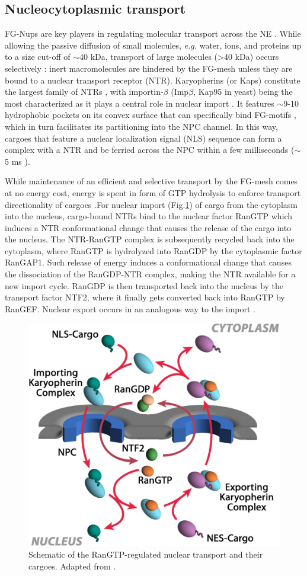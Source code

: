\subsection{Nucleocytoplasmic transport}	
FG-Nups are key players in regulating molecular transport across the NE \cite{Wente2000}. While allowing the passive diffusion of small molecules, \emph{e.g.} water, ions, and proteins up to a size cut-off of $\sim$40 kDa, transport of large molecules (>40 kDa) occurs selectively \cite{Zilman2007}: inert macromolecules are hindered by the FG-mesh unless they are bound to a nuclear transport receptor (NTR). Karyopherins (or Kaps) constitute the largest family of NTRs \cite{Tu2011}, with importin-$\beta$ (Imp$\beta$, Kap95 in yeast) being the most characterized as it plays a central role in nuclear import \cite{Harel2004}. It features $\sim$9-10 hydrophobic pockets on its convex surface that can specifically bind FG-motifs \cite{Bayliss2000}, which in turn facilitates its partitioning into the NPC channel. In this way, cargoes that feature a nuclear localization signal (NLS) sequence can form a complex with a NTR and be ferried across the NPC within a few milliseconds ($\sim$5 ms \cite{Dange2008}). 

While maintenance of an efficient and selective transport by the FG-mesh comes at no energy cost, energy is spent in form of GTP hydrolysis to enforce transport directionality of cargoes \cite{Gorlich1996a,Jovanovic-Talisman2017}.For nuclear import (Fig.\ref{fig:fig1.4}) of cargo from the cytoplasm into the nucleus, cargo-bound NTRs bind to the nuclear factor RanGTP which induces a NTR conformational change that causes the release of the cargo into the nucleus. The NTR-RanGTP complex is subsequently recycled back into the cytoplasm, where RanGTP is hydrolyzed into RanGDP by the cytoplasmic factor RanGAP1. Such release of energy induces a conformational change that causes the dissociation of the RanGDP-NTR complex, making the NTR available for a new import cycle. RanGDP is then transported back into the nucleus by the transport factor NTF2, where it finally gets converted back into RanGTP by RanGEF. Nuclear export occurs in an analogous way to the import \cite{Cautain2015}.
\begin{figure}[!htbp]
	\centering
	\includegraphics[width=0.65\linewidth]{figures/Figure1.4.pdf}
	\caption{Schematic of the RanGTP-regulated nuclear transport and their cargoes. Adapted from \cite{Aitchison2012}.}
	\label{fig:fig1.4}
\end{figure}

